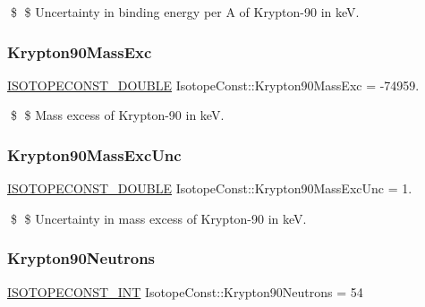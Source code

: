 \$ \$ Uncertainty in binding energy per A of Krypton-\/90 in keV. \mbox{\label{group___isotope_const-_krypton-_kr90_ga2e52497f1812ef96569ee936b4f7f2d4}} 
\subsubsection{\texorpdfstring{Krypton90\+Mass\+Exc}{Krypton90MassExc}}
{\footnotesize\ttfamily \mbox{\hyperlink{group___isotope_const-_macros_ga8f45a7272ce02c0b4c65c44636ed719a}{I\+S\+O\+T\+O\+P\+E\+C\+O\+N\+S\+T\+\_\+\+D\+O\+U\+B\+LE}} Isotope\+Const\+::\+Krypton90\+Mass\+Exc = -\/74959.}

\$ \$ Mass excess of Krypton-\/90 in keV. \mbox{\label{group___isotope_const-_krypton-_kr90_ga162bbd0779ffec2007c7582d1daf07e1}} 
\subsubsection{\texorpdfstring{Krypton90\+Mass\+Exc\+Unc}{Krypton90MassExcUnc}}
{\footnotesize\ttfamily \mbox{\hyperlink{group___isotope_const-_macros_ga8f45a7272ce02c0b4c65c44636ed719a}{I\+S\+O\+T\+O\+P\+E\+C\+O\+N\+S\+T\+\_\+\+D\+O\+U\+B\+LE}} Isotope\+Const\+::\+Krypton90\+Mass\+Exc\+Unc = 1.}

\$ \$ Uncertainty in mass excess of Krypton-\/90 in keV. \mbox{\label{group___isotope_const-_krypton-_kr90_ga51a7710b7cd30479dc965407f413198d}} 
\subsubsection{\texorpdfstring{Krypton90\+Neutrons}{Krypton90Neutrons}}
{\footnotesize\ttfamily \mbox{\hyperlink{group___isotope_const-_macros_ga5f18360b3e99483a35c32d789e62621c}{I\+S\+O\+T\+O\+P\+E\+C\+O\+N\+S\+T\+\_\+\+I\+NT}} Isotope\+Const\+::\+Krypton90\+Neutrons = 54}

